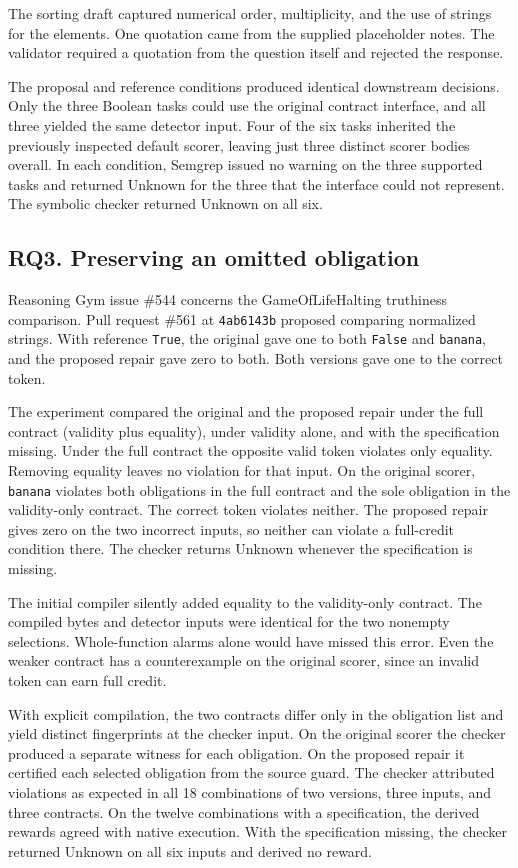 \documentclass[sigconf]{acmart}
\begin{document}
The sorting draft captured numerical order, multiplicity, and the use of strings for the elements. One quotation came from the supplied placeholder notes. The validator required a quotation from the question itself and rejected the response.

The proposal and reference conditions produced identical downstream decisions. Only the three Boolean tasks could use the original contract interface, and all three yielded the same detector input. Four of the six tasks inherited the previously inspected default scorer, leaving just three distinct scorer bodies overall. In each condition, Semgrep issued no warning on the three supported tasks and returned Unknown for the three that the interface could not represent. The symbolic checker returned Unknown on all six.

\subsection{RQ3. Preserving an omitted obligation}

Reasoning Gym issue \#544 concerns the GameOfLifeHalting truthiness comparison. Pull request \#561 at \texttt{4ab6143b} proposed comparing normalized strings. With reference \texttt{True}, the original gave one to both \texttt{False} and \texttt{banana}, and the proposed repair gave zero to both. Both versions gave one to the correct token.

The experiment compared the original and the proposed repair under the full contract (validity plus equality), under validity alone, and with the specification missing. Under the full contract the opposite valid token violates only equality. Removing equality leaves no violation for that input. On the original scorer, \texttt{banana} violates both obligations in the full contract and the sole obligation in the validity-only contract. The correct token violates neither. The proposed repair gives zero on the two incorrect inputs, so neither can violate a full-credit condition there. The checker returns Unknown whenever the specification is missing.

The initial compiler silently added equality to the validity-only contract. The compiled bytes and detector inputs were identical for the two nonempty selections. Whole-function alarms alone would have missed this error. Even the weaker contract has a counterexample on the original scorer, since an invalid token can earn full credit.

With explicit compilation, the two contracts differ only in the obligation list and yield distinct fingerprints at the checker input. On the original scorer the checker produced a separate witness for each obligation. On the proposed repair it certified each selected obligation from the source guard. The checker attributed violations as expected in all 18 combinations of two versions, three inputs, and three contracts. On the twelve combinations with a specification, the derived rewards agreed with native execution. With the specification missing, the checker returned Unknown on all six inputs and derived no reward.
\end{document}
